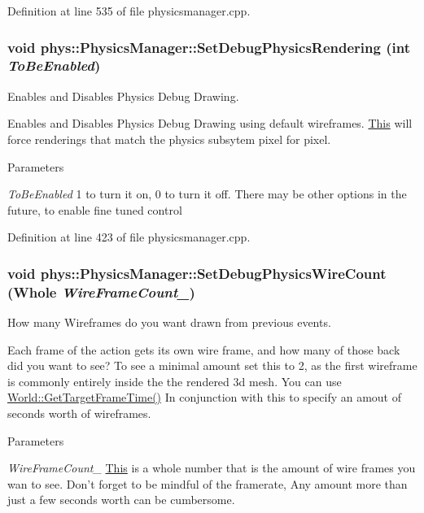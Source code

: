 Definition at line 535 of file physicsmanager.cpp.

\hypertarget{classphys_1_1PhysicsManager_a67fb59148a94ced0a92b288a638f89db}{
\subsubsection[{SetDebugPhysicsRendering}]{\setlength{\rightskip}{0pt plus 5cm}void phys::PhysicsManager::SetDebugPhysicsRendering (int {\em ToBeEnabled})}}
\label{d3/dcc/classphys_1_1PhysicsManager_a67fb59148a94ced0a92b288a638f89db}


Enables and Disables Physics Debug Drawing. 

Enables and Disables Physics Debug Drawing using default wireframes. \hyperlink{structThis}{This} will force renderings that match the physics subsytem pixel for pixel. 
\begin{DoxyParams}{Parameters}
\item[{\em ToBeEnabled}]1 to turn it on, 0 to turn it off. There may be other options in the future, to enable fine tuned control \end{DoxyParams}


Definition at line 423 of file physicsmanager.cpp.

\hypertarget{classphys_1_1PhysicsManager_ab43a963cf26ca4293a7c34a2a68c4f2c}{
\subsubsection[{SetDebugPhysicsWireCount}]{\setlength{\rightskip}{0pt plus 5cm}void phys::PhysicsManager::SetDebugPhysicsWireCount ({\bf Whole} {\em WireFrameCount\_\-})}}
\label{d3/dcc/classphys_1_1PhysicsManager_ab43a963cf26ca4293a7c34a2a68c4f2c}


How many Wireframes do you want drawn from previous events. 

Each frame of the action gets its own wire frame, and how many of those back did you want to see? To see a minimal amount set this to 2, as the first wireframe is commonly entirely inside the the rendered 3d mesh. You can use \hyperlink{classphys_1_1World_aa063ace52be484c7b03ec5859453f48b}{World::GetTargetFrameTime()} In conjunction with this to specify an amout of seconds worth of wireframes. 
\begin{DoxyParams}{Parameters}
\item[{\em WireFrameCount\_\-}]\hyperlink{structThis}{This} is a whole number that is the amount of wire frames you wan to see. Don't forget to be mindful of the framerate, Any amount more than just a few seconds worth can be cumbersome. \end{DoxyParams}


